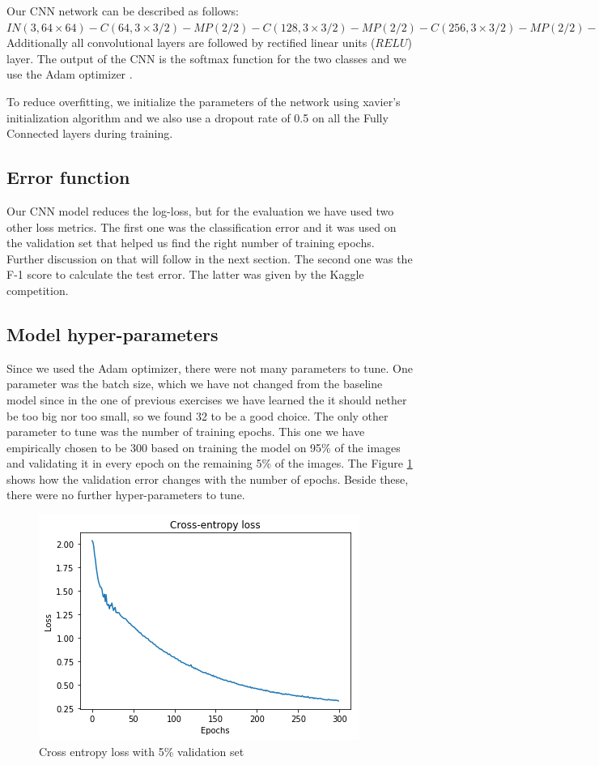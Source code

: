\documentclass[10pt,conference,compsocconf]{IEEEtran}
\begin{document}
Our CNN network can be described as follows: \\
$IN(3, 64\times64)
-C(64, 3\times3 /2) - MP(2 / 2) - C(128, 3\times3 /2) - MP(2 / 2)
-C(256, 3\times3 /2) - MP(2 / 2) - C(512, 3\times3 /2) - MP(2 / 2)
-FC(2048)-FC(2048)-FC(2)$\\

Additionally all convolutional layers are followed by rectified linear units ($RELU$) layer. The output of the CNN is the softmax function for the two classes and we use the Adam optimizer \cite{adam}.

To reduce overfitting, we initialize the parameters of the network using xavier's initialization algorithm \cite{xavier} and we also use a dropout rate of 0.5 on all the Fully Connected layers during training.
\subsection{Error function}
Our CNN model reduces the log-loss, but for the evaluation we have used two other loss metrics. The first one was
the classification error and it was used on the validation set that helped us find the right number of training epochs. 
Further discussion on that will follow in the next section. The second one was the F-1 score to calculate
the test error. The latter was given by the Kaggle competition.


\subsection{Model hyper-parameters}
Since we used the Adam optimizer, there were not many parameters to tune. One parameter was the batch size, which we 
have not changed from the baseline model since in the one of previous exercises we have learned the it should nether be too
big nor too small, so we found 32 to be a good choice. The only other parameter to tune was the number of training epochs.
This one we have empirically chosen to be 300 based on training the model on 95\% of the images and 
validating it in every epoch on the remaining 5\% of the images. The Figure \ref{fig:loss} shows
how the validation error changes with the number of epochs. Beside these, there were no further hyper-parameters to tune.


\begin{figure}[h]
 \centering
  \includegraphics[width=.8\linewidth]{loss.png}
  \caption{Cross entropy loss with 5\% validation set}
  \label{fig:loss}
\end{figure}
\end{document}
